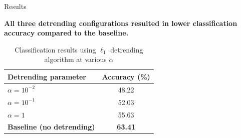 \documentclass[]{beamer}
\begin{document}

\begin{frame}{Results}

    \textbf{All three detrending configurations resulted in lower classification accuracy compared to the baseline.}

    \vspace{0.5cm}

    \begin{table}[htbp]
    \scriptsize
    \captionsetup{font=scriptsize}
    \centering
    \caption{Classification results using $\ell_1$ detrending algorithm at various $\alpha$}
    \begin{tabular}{@{}lc@{}}
        \toprule
        \textbf{Detrending parameter} & \textbf{Accuracy (\%)} \\ \midrule
        $\alpha = 10^{-2}$            & 48.22 \\
        $\alpha = 10^{-1}$            & 52.03 \\
        $\alpha = 1$                  & 55.63 \\
        \textbf{Baseline (no detrending)}  & \textbf{63.41} \\
        \bottomrule
    \end{tabular}
\end{table}
\end{frame}
\end{document}
